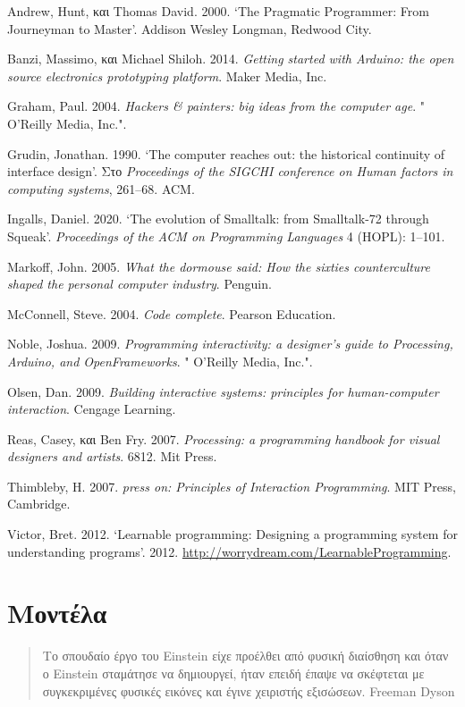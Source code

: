 \documentclass[
]{article}
\newlength{\cslhangindent}
\newlength{\cslentryspacingunit} %
\newenvironment{CSLReferences}[2] %
 {%
  \setlength{\parindent}{0pt}
  \ifodd #1
  \let\oldpar\par
  \def\par{\hangindent=\cslhangindent\oldpar}
  \fi
  \setlength{\parskip}{#2\cslentryspacingunit}
 }%
 {}
\begin{document}
\hypertarget{refs}{}
\begin{CSLReferences}{0}{0}
\end{CSLReferences}

Andrew, Hunt, και Thomas David. 2000. {`The Pragmatic Programmer: From
Journeyman to Master'}. Addison Wesley Longman, Redwood City.

Banzi, Massimo, και Michael Shiloh. 2014. \emph{Getting started with
Arduino: the open source electronics prototyping platform}. Maker Media,
Inc.

Graham, Paul. 2004. \emph{Hackers \& painters: big ideas from the
computer age}. " O'Reilly Media, Inc.".

Grudin, Jonathan. 1990. {`The computer reaches out: the historical
continuity of interface design'}. Στο \emph{Proceedings of the SIGCHI
conference on Human factors in computing systems}, 261--68. ACM.

Ingalls, Daniel. 2020. {`The evolution of Smalltalk: from Smalltalk-72
through Squeak'}. \emph{Proceedings of the ACM on Programming Languages}
4 (HOPL): 1--101.

Markoff, John. 2005. \emph{What the dormouse said: How the sixties
counterculture shaped the personal computer industry}. Penguin.

McConnell, Steve. 2004. \emph{Code complete}. Pearson Education.

Noble, Joshua. 2009. \emph{Programming interactivity: a designer's guide
to Processing, Arduino, and OpenFrameworks}. " O'Reilly Media, Inc.".

Olsen, Dan. 2009. \emph{Building interactive systems: principles for
human-computer interaction}. Cengage Learning.

Reas, Casey, και Ben Fry. 2007. \emph{Processing: a programming handbook
for visual designers and artists}. 6812. Mit Press.

Thimbleby, H. 2007. \emph{press on: Principles of Interaction
Programming}. MIT Press, Cambridge.

Victor, Bret. 2012. {`Learnable programming: Designing a programming
system for understanding programs'}. 2012.
\url{http://worrydream.com/LearnableProgramming}.

\hypertarget{ux3bcux3bfux3bdux3c4ux3adux3bbux3b1}{%
\section{Μοντέλα}\label{ux3bcux3bfux3bdux3c4ux3adux3bbux3b1}}

\begin{quote}
Το σπουδαίο έργο του Einstein είχε προέλθει από φυσική διαίσθηση και
όταν ο Einstein σταμάτησε να δημιουργεί, ήταν επειδή έπαψε να σκέφτεται
με συγκεκριμένες φυσικές εικόνες και έγινε χειριστής εξισώσεων. Freeman
Dyson
\end{quote}
\end{document}
